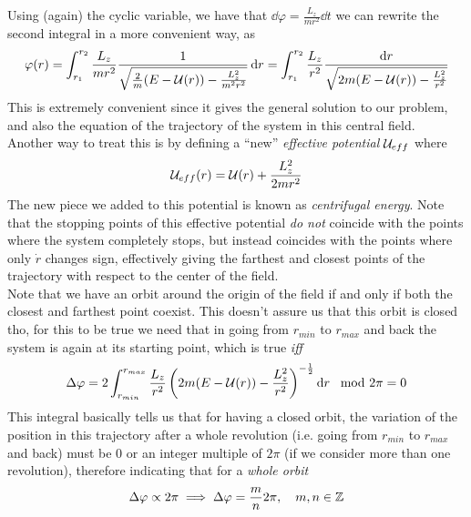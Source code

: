 \documentclass[../admech.tex]{subfiles}
\begin{document}
Using (again) the cyclic variable, we have that $\dd{\varphi}=\frac{L_z}{mr^2}\dd{t}$ we can rewrite the second integral in a more convenient way, as
\begin{equation}
	\varphi(r)=\int_{r_1}^{r_2}\frac{L_z}{mr^2}\frac{1}{\sqrt{\frac{2}{m}(E-\mathcal{U}(r))-\frac{L_z^2}{m^2r^2}}}\dd{r}=\int_{r_1}^{r_2}\frac{L_z}{r^2}\frac{\dd{r}}{\sqrt{2m(E-\mathcal{U}(r))-\frac{L^2_z}{r^2}}}
	\label{eq:orbiteq}
\end{equation}
This is extremely convenient since it gives the general solution to our problem, and also the equation of the trajectory of the system in this central field.\\
Another way to treat this is by defining a ``new'' \emph{effective potential} $\mathcal{U}_{eff}$ where
\begin{equation}
	\mathcal{U}_{eff}(r)=\mathcal{U}(r)+\frac{L_z^2}{2mr^2}
	\label{eq:effpot}
\end{equation}
The new piece we added to this potential is known as \emph{centrifugal energy}. Note that the stopping points of this effective potential \emph{do not} coincide with the points where the system completely stops, but instead coincides with the points where only $\dot{r}$ changes sign, effectively giving the farthest and closest points of the trajectory with respect to the center of the field.\\
Note that we have an orbit around the origin of the field if and only if both the closest and farthest point coexist. This doesn't assure us that this orbit is closed tho, for this to be true we need that in going from $r_{min}$ to $r_{max}$ and back the system is again at its starting point, which is true \emph{iff}
\begin{equation}
	\Delta\varphi=2\int_{r_{min}}^{r_{max}}\frac{L_z}{r^2}\left( 2m(E-\mathcal{U}(r))-\frac{L_z^2}{r^2} \right)^{-\frac{1}{2}}\dd{r}\mod{2\pi}=0
	\label{eq:closedorbit}
\end{equation}
This integral basically tells us that for having a closed orbit, the variation of the position in this trajectory after a whole revolution (i.e. going from $r_{min}$ to $r_{max}$ and back) must be 0 or an integer multiple of $2\pi$ (if we consider more than one revolution), therefore indicating that for a \emph{whole orbit}
\begin{equation}
	\Delta\varphi\propto2\pi\implies\Delta\varphi=\frac{m}{n}2\pi,\quad m,n\in\operatorname{\mathbb{Z}}
	\label{eq:closedorbitprop}
\end{equation}
\end{document}
